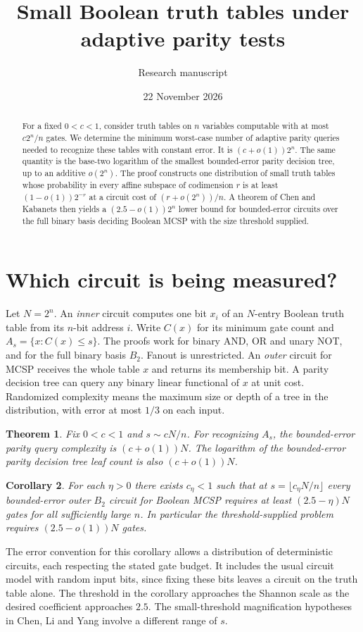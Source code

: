 \documentclass[11pt]{article}
\title{Small Boolean truth tables under adaptive parity tests}
\author{Research manuscript}
\date{22 November 2026}
\newtheorem{theorem}{Theorem}[section]
\newtheorem{corollary}[theorem]{Corollary}
\begin{document}
\maketitle
\begin{abstract}
For a fixed $0<c<1$, consider truth tables on $n$ variables computable with at most $c2^n/n$ gates. We determine the minimum worst-case number of adaptive parity queries needed to recognize these tables with constant error. It is $(c+o(1))2^n$. The same quantity is the base-two logarithm of the smallest bounded-error parity decision tree, up to an additive $o(2^n)$. The proof constructs one distribution of small truth tables whose probability in every affine subspace of codimension $r$ is at least $(1-o(1))2^{-r}$ at a circuit cost of $(r+o(2^n))/n$. A theorem of Chen and Kabanets then yields a $(2.5-o(1))2^n$ lower bound for bounded-error circuits over the full binary basis deciding Boolean MCSP with the size threshold supplied.
\end{abstract}

\section{Which circuit is being measured?}
Let $N=2^n$. An \emph{inner} circuit computes one bit $x_i$ of an $N$-entry Boolean truth table from its $n$-bit address $i$. Write $C(x)$ for its minimum gate count and $A_s=\{x:C(x)\le s\}$. The proofs work for binary AND, OR and unary NOT, and for the full binary basis $B_2$. Fanout is unrestricted. An \emph{outer} circuit for MCSP receives the whole table $x$ and returns its membership bit. A parity decision tree can query any binary linear functional of $x$ at unit cost. Randomized complexity means the maximum size or depth of a tree in the distribution, with error at most $1/3$ on each input.

\begin{theorem}\label{th:main}
Fix $0<c<1$ and $s\sim cN/n$. For recognizing $A_s$, the bounded-error parity query complexity is $(c+o(1))N$. The logarithm of the bounded-error parity decision tree leaf count is also $(c+o(1))N$.
\end{theorem}
\begin{corollary}\label{cor:circuit}
For each $\eta>0$ there exists $c_\eta<1$ such that at $s=\lfloor c_\eta N/n\rfloor$ every bounded-error outer $B_2$ circuit for Boolean MCSP requires at least $(2.5-\eta)N$ gates for all sufficiently large $n$. In particular the threshold-supplied problem requires $(2.5-o(1))N$ gates.
\end{corollary}
The error convention for this corollary allows a distribution of deterministic circuits, each respecting the stated gate budget. It includes the usual circuit model with random input bits, since fixing these bits leaves a circuit on the truth table alone. The threshold in the corollary approaches the Shannon scale as the desired coefficient approaches $2.5$. The small-threshold magnification hypotheses in Chen, Li and Yang \cite{cly} involve a different range of $s$.
\end{document}
